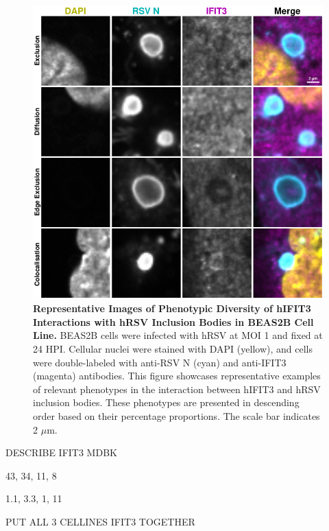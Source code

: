 \begin{figure}
    \centering
    \includegraphics[width=1\linewidth]{08. Chapter 3/Figs/02. Infection/03. IFIT3/06. beas2b i3.pdf}
    \caption[Representative Images of Phenotypic Diversity of hIFIT3 Interactions with hRSV Inclusion Bodies in BEAS2B Cell Line]{\textbf{Representative Images of Phenotypic Diversity of hIFIT3 Interactions with hRSV Inclusion Bodies in BEAS2B Cell Line.} BEAS2B cells were infected with hRSV at MOI 1 and fixed at 24 HPI. Cellular nuclei were stained with DAPI (yellow), and cells were double-labeled with anti-RSV N (cyan) and anti-IFIT3 (magenta) antibodies. This figure showcases representative examples of relevant phenotypes in the interaction between hIFIT3 and hRSV inclusion bodies. These phenotypes are presented in descending order based on their percentage proportions. The scale bar indicates 2 \(\mu \mbox{m}\).}
    \label{fig:Representative Images of Phenotypic Diversity of hIFIT3 Interactions with hRSV Inclusion Bodies in BEAS2B Cell Line}
\end{figure}

DESCRIBE IFIT3 MDBK

43, 34, 11, 8

1.1, 3.3, 1, 11

PUT ALL 3 CELLINES IFIT3 TOGETHER

